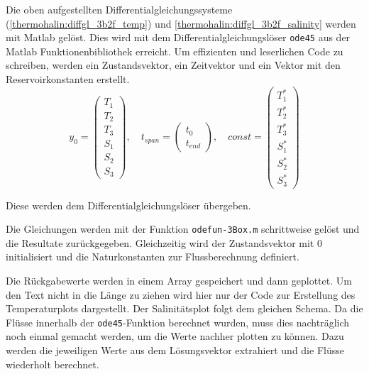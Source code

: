 Die oben aufgestellten Differentialgleichungssysteme (\ref{thermohalin:diffgl_3b2f_temp}) und \ref{thermohalin:diffgl_3b2f_salinity} werden mit Matlab gelöst. Dies wird mit dem Differentialgleichungslöser \texttt{ode45} aus der Matlab Funktionenbibliothek erreicht.
Um effizienten und leserlichen Code zu schreiben, werden ein Zustandsvektor, ein Zeitvektor und ein Vektor mit den Reservoirkonstanten erstellt.
\begin{equation*}
y_0 = \begin{pmatrix}T_{1} \\ T_{2} \\ T_{3} \\ S_{1} \\ S_{2} \\ S_{3}\end{pmatrix}, \quad
t_{span} = \begin{pmatrix}t_0 \\ t_{end} \end{pmatrix}, \quad
const = \begin{pmatrix}T_{1}^{*} \\ T_{2}^{*} \\ T_{3}^{*} \\ S_{1}^{*} \\ S_{2}^{*} \\ S_{3}^{*}\end{pmatrix}
\end{equation*}




\label{thermohalin:listing:input}
Diese werden dem Differentialgleichungslöser übergeben.
\label{thermohalin:listing:uebergabe}

Die Gleichungen werden mit der Funktion \texttt{odefun-3Box.m} schrittweise gelöst und die Resultate zurückgegeben. Gleichzeitig wird der Zustandsvektor mit $0$ initialisiert und die Naturkonstanten zur Flussberechnung definiert.

\label{thermohalin:listing:solve}

Die Rückgabewerte werden in einem Array gespeichert und dann geplottet. Um den Text nicht in die Länge zu ziehen wird hier nur der Code zur Erstellung des Temperaturplots dargestellt. Der Salinitätsplot folgt dem gleichen Schema.
Da die Flüsse innerhalb der \texttt{ode45}-Funktion berechnet wurden, muss dies nachträglich noch einmal gemacht werden, um die Werte nachher plotten zu können. Dazu werden die jeweiligen Werte aus dem Lösungsvektor extrahiert und die Flüsse wiederholt berechnet.
\label{thermohalin:listing:plot}

